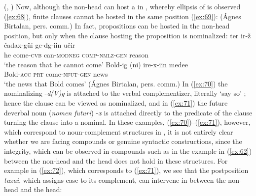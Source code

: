 \documentclass[output=paper]{LSP/langsci}
\begin{document}
\hfill (, \citealt[16]{Gauntetal2004})
\z
Now, although the non-head can host a  in , whereby ellipsis of  is observed (\ref{ex:68}), finite clauses cannot be hosted in the same position (\ref{ex:69}):
 \hfill(\'{A}gnes Birtalan, pers. comm.)   
 \z
 \z
In fact, propositions can be hosted in the non-head position, but only when the clause hosting the proposition is nominalized:
\ea\label{ex:70}
	\gll ter ir-ž čadax-güi ge-dg-iin učir\\
		he come-\textsc{cvb} can-\textsc{modneg} \textsc{comp-nmlz-gen} reason\\
	\glt `the reason that he cannot come' \hfill \citep[309]{Kullmann1996}
\z
\ea\label{ex:71}
	\gll \lb{} Bold-ig (ni) ire-x\rb{}-iin medee\\
		{} Bold-\textsc{acc} \textsc{prt} come-\textsc{nfut-gen} news\\
	\glt  `the news that Bold comes' \hfill (\'{A}gnes Birtalan, pers. comm.)
\z
In (\ref{ex:70}) the nominalizing  -\textit{d(V)g} is attached to the verbal complementizer, literally `say so' \citep{vonHeusingeretal2011}; hence the clause can be viewed as nominalized, and in (\ref{ex:71}) the future deverbal noun (\textit{nomen futuri})  -\textit{x} is attached directly to the predicate of the clause turning the clause into a nominal. In these examples, (\ref{ex:70})--(\ref{ex:71}), however, which correspond to noun-complement structures in , it is not entirely clear whether we are facing compounds or genuine syntactic constructions, since the integrity, which can be observed in compounds such as in the  example in (\ref{ex:62}) between the non-head and the head does not hold in these structures. For example in (\ref{ex:72}), which corresponds to (\ref{ex:71}), we see that the postposition \textit{tuxai}, which assigns  case to its complement, can intervene in between the non-head and the head:
\end{document}
